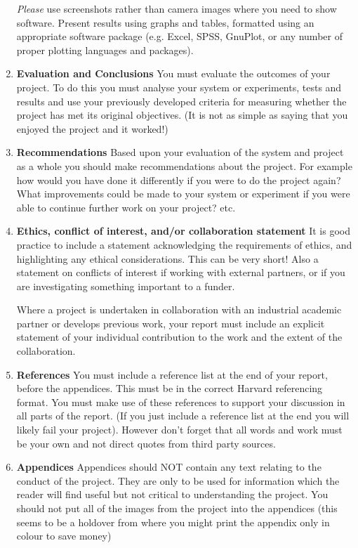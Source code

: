 \begin{enumerate}
    \textit{Please} use screenshots rather than camera images where you need to show software. Present results using graphs and tables, formatted using an appropriate software package (e.g. Excel, SPSS, GnuPlot, or any number of proper plotting languages and packages).

    \item \textbf{Evaluation and Conclusions}
    \subitem You must evaluate the outcomes of your project. To do this you must analyse your system or
    experiments, tests and results and use your previously developed criteria for measuring whether the project has met its original objectives. (It is not as simple as saying that you enjoyed the project and it worked!)
    
    \item \textbf{Recommendations}
    \subitem Based upon your evaluation of the system and project as a whole you should make recommendations about the project. For example how would you have done it differently if you were to do the project again? What improvements could be made to your system or experiment if you were able to continue further work on your project? etc.

    \item \textbf{Ethics, conflict of interest, and/or collaboration statement}
    \subitem It is good practice to include a statement acknowledging the requirements of ethics, and highlighting any ethical considerations. This can be very short! Also a statement on conflicts of interest if working with external partners, or if you are investigating something important to a funder.

    \begin{tcolorbox}
        Where a project is undertaken in collaboration with an industrial academic partner or develops previous work, your report must include an explicit statement of your individual contribution to the work and the extent of the collaboration.
    \end{tcolorbox}
    
    \item \textbf{References}
    \subitem You must include a reference list at the end of your report, before the appendices. This must be in the correct Harvard referencing format. You must make use of these references to support your discussion in all parts of the report. (If you just include a reference list at the end you will likely fail your project). However don’t forget that all words and work must be your own and not direct quotes from third party sources.
    
    \item \textbf{Appendices}
    \subitem Appendices should NOT contain any text relating to the conduct of the project. They are only
    to be used for information which the reader will find useful but not critical to understanding the project. You should not put all of the images from the project into the appendices (this seems to be a holdover from where you might print the appendix only in colour to save money)
\end{enumerate}


